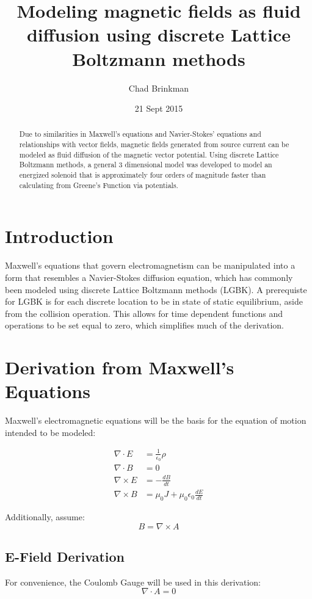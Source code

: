 \documentclass[12pt,a4paper]{article}
\author{Chad Brinkman}
\title{Modeling magnetic fields as fluid diffusion using discrete Lattice Boltzmann methods}
\date{21 Sept 2015}
\begin{document}
\maketitle
\begin{abstract}
Due to similarities in Maxwell's equations and Navier-Stokes' equations and relationships with vector fields, magnetic fields generated from source current can be modeled as fluid diffusion of the magnetic vector potential. Using discrete Lattice Boltzmann methods, a general 3 dimensional model was developed to model an energized solenoid that is approximately four orders of magnitude faster than calculating from Greene's Function via potentials. 
\end{abstract}
 
\section{Introduction}
Maxwell's equations that govern electromagnetism can be manipulated into a form that resembles a Navier-Stokes diffusion equation, which has commonly been modeled using discrete Lattice Boltzmann methods (LGBK). A prerequiste for LGBK is for each discrete location to be in state of static equilibrium, aside from the collision operation. This allows for time dependent functions and operations to be set equal to zero, which simplifies much of the derivation. 

\section{Derivation from Maxwell's Equations}
Maxwell's electromagnetic equations will be the basis for the equation of motion intended to be modeled: 

\begin{align}
\nabla \cdot E &= \frac{1}{\epsilon_0} \rho \\
\nabla \cdot B &= 0 \\
\nabla \times E &= -\frac{dB}{dt} \\
\nabla \times B &= \mu_0 J + \mu_0 \epsilon_0 \frac{dE}{dt} 
\end{align}

Additionally, assume:
\begin{equation}
B = \nabla \times A
\end{equation}  

\subsection{E-Field Derivation}
For convenience, the Coulomb Gauge will be used in this derivation:
\begin{equation}
\nabla \cdot A = 0
\end{equation}
\end{document}
